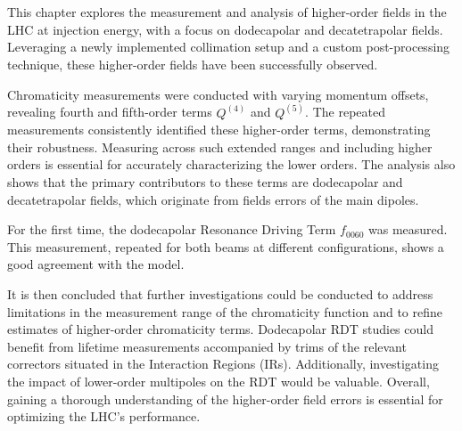 \section{}

This chapter explores the measurement and analysis of higher-order fields in the LHC at injection 
energy, with a focus on dodecapolar and decatetrapolar fields. Leveraging a newly implemented
collimation setup and a custom post-processing technique, these higher-order fields have been
successfully observed.

Chromaticity measurements were conducted with varying momentum offsets, revealing fourth and
fifth-order terms $Q^{(4)}$ and $Q^{(5)}$. The repeated measurements consistently identified these
higher-order terms, demonstrating their robustness. Measuring across such extended ranges and
including higher orders is essential for accurately characterizing the lower orders. The analysis
also shows that the primary contributors to these terms are dodecapolar and decatetrapolar fields,
which originate from fields errors of the main dipoles.

For the first time, the dodecapolar Resonance Driving Term $f_{0060}$ was measured. This
measurement, repeated for both beams at different configurations, shows a good agreement with the
model.

It is then concluded that further investigations could be conducted to address limitations in the
measurement range of the chromaticity function and to refine estimates of higher-order chromaticity
terms. Dodecapolar RDT studies could benefit from lifetime measurements accompanied by trims of
the relevant correctors situated in the Interaction Regions (IRs). Additionally, investigating the 
impact of lower-order multipoles on the RDT would be valuable.
Overall, gaining a thorough understanding of the higher-order field errors is essential for
optimizing the LHC's performance.